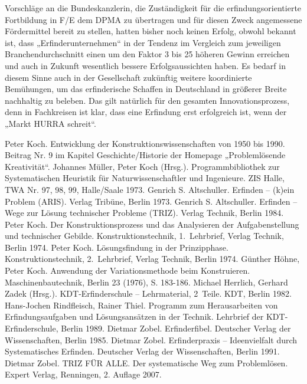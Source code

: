 \documentclass[11pt,a4paper]{article}
\begin{document}
Vorschläge an die Bundeskanzlerin, die Zuständigkeit für die
erfindungsorientierte Fortbildung in F/E dem DPMA zu übertragen und für diesen
Zweck angemessene Fördermittel bereit zu stellen, hatten bisher noch keinen
Erfolg, obwohl bekannt ist, dass „Erfinderunternehmen“ in der Tendenz im
Vergleich zum jeweiligen Branchendurchschnitt einen um den Faktor 3 bis 25
höheren Gewinn erreichen und auch in Zukunft wesentlich bessere
Erfolgsaussichten haben. Es bedarf in diesem Sinne auch in der Gesellschaft
zukünftig weitere koordinierte Bemühungen, um das erfinderische Schaffen in
Deutschland in größerer Breite nachhaltig zu beleben. Das gilt natürlich für
den gesamten Innovationsprozess, denn in Fachkreisen ist klar, dass eine
Erfindung erst erfolgreich ist, wenn der „Markt HURRA schreit“.

\begin{thebibliography}{xxx}
 Peter Koch. Entwicklung der Konstruktionswissenschaften von 1950
  bis 1990. Beitrag Nr. 9 im Kapitel Geschichte/Historie der Homepage
  „Problemlösende Kreativität“.
 Johannes Müller, Peter Koch (Hrsg.). Programmbibliothek zur
  Systematischen Heuristik für Naturwissenschaftler und Ingenieure. ZIS Halle,
  TWA Nr. 97, 98, 99, Halle/Saale 1973.
 Genrich S. Altschuller. Erfinden -- (k)ein Problem (ARIS).
  Verlag Tribüne, Berlin 1973.
 Genrich S. Altschuller. Erfinden -- Wege zur Lösung technischer
  Probleme (TRIZ). Verlag Technik, Berlin 1984.
 Peter Koch. Der Konstruktionsprozess und das Analysieren der
  Aufgabenstellung und technischer Gebilde. Konstruktionstechnik,
  1.~Lehrbrief, Verlag Technik, Berlin 1974.
 Peter Koch.  Lösungsfindung in der Prinzipphase.
  Konstruktionstechnik, 2.~Lehrbrief, Verlag Technik,  Berlin 1974.
 Günther Höhne, Peter Koch. Anwendung der Variationsmethode beim
  Konstruieren. Maschinenbautechnik, Berlin 23 (1976), S. 183-186.
 Michael Herrlich, Gerhard Zadek (Hrsg.). KDT-Erfinderschule --
  Lehrmaterial, 2~Teile. KDT, Berlin 1982.
 Hans-Jochen Rindfleisch, Rainer Thiel. Programm zum Herausarbeiten
  von Erfindungsaufgaben und Lösungsansätzen in der Technik. Lehrbrief der
  KDT-Erfinderschule, Berlin 1989.
 Dietmar Zobel. Erfinderfibel. Deutscher Verlag der
  Wissenschaften, Berlin 1985.
 Dietmar Zobel. Erfinderpraxis -- Ideenvielfalt durch
  Systematisches Erfinden.  Deutscher Verlag der Wissenschaften, Berlin 1991.
 Dietmar Zobel. TRIZ FÜR ALLE. Der systematische Weg zum
  Problemlösen. Expert Verlag, Renningen, 2. Auflage 2007.

\end{thebibliography}
\end{document}
